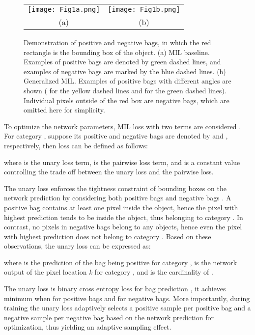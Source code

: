 \documentclass[runningheads]{llncs}
\begin{document}
\begin{figure}[htbp] 
	\centering
	\setlength{\tabcolsep}{2pt}
	\begin{tabular}{cc}
	\texttt{[image: Fig1a.png]} &
	\texttt{[image: Fig1b.png]} \\ 
	(a)&(b) \\
	\end{tabular}
	\caption{Demonstration of positive and negative bags, in which the red rectangle is the bounding box of the object. (a) MIL baseline. Examples of positive bags are denoted by green dashed lines, and examples of negative bags are marked by the blue dashed lines. (b) Generalized MIL. Examples of positive bags with different angles are shown ( for the yellow dashed lines and  for the green dashed lines). Individual pixels outside of the red box are negative bags, which are omitted here for simplicity. }
	\label{fig:mil_demonstration}
\end{figure}

To optimize the network parameters, MIL loss with two terms are considered \cite{hsu2019weakly}. For category , suppose its positive and negative bags are denoted by  and , respectively, then loss  can be defined as follows:

where  is the unary loss term,  is the pairwise loss term, and  is a constant value controlling the trade off between the unary loss and the pairwise loss.

The unary loss  enforces the tightness constraint of bounding boxes on the network prediction  by considering both positive bags  and negative bags . A positive bag contains at least one pixel inside the object, hence the pixel with highest prediction tends to be inside the object, thus belonging to category . In contrast, no pixels in negative bags belong to any objects, hence even the pixel with highest prediction does not belong to category . Based on these observations, the unary loss  can be expressed as:

where  is the prediction of the bag  being positive for category ,  is the network output of the pixel location \textit{k} for category , and  is the cardinality of . 

The unary loss is binary cross entropy loss for bag prediction , it achieves minimum when  for positive bags and  for negative bags. More importantly, during training the unary loss adaptively selects a positive sample per positive bag and a negative sample per negative bag based on the network prediction for optimization, thus yielding an adaptive sampling effect. 
\end{document}

